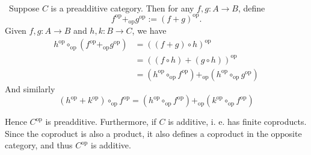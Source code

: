 
\def\op{\text{op}}


\mmaketitle

\begin{exercise}[1]\ 

\end{exercise}


\begin{exercise}[2]\ 
Suppose $C$ is a preadditive category. Then 
for any $f,g : A \to B$, define
\[ f^\op +_\op g^\op := (f + g)^\op. \]
Given $f,g : A \to B$ and $h,k : B \to C$, we have
\begin{align*}
h^\op \circ_\op (f^\op +_\op g^\op)  
&= ((f+g)\circ h)^\op \\
&= ((f\circ h) + (g\circ h))^\op \\
&= (h^\op \circ_\op f^\op) +_\op (h^\op \circ_\op g^\op)
\end{align*}
And similarly 
\[ (h^\op + k^\op) \circ_\op f^\op = (h^\op \circ_\op f^\op) +_\op (k^\op \circ_\op
f^\op) \]

Hence $C^\op$ is preadditive. 
Furthermore, if $C$ is additive, i. e. has finite coproducts. 
Since the coproduct is also a product, it also defines a coproduct in the
opposite category, and thus $C^\op$ is additive.
\end{exercise}





